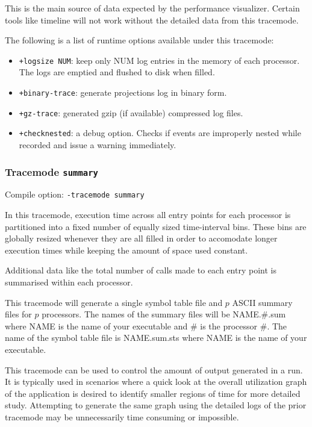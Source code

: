 \documentclass[10pt]{article}
\begin{document}
This is the main source of data expected by the performance
visualizer. Certain tools like timeline will not work without the
detailed data from this tracemode.

The following is a list of runtime options available under this tracemode:

\begin{itemize}
\item
{\tt +logsize NUM}: keep only NUM log entries in the memory of each
processor. The logs are emptied and flushed to disk when filled.
\item
{\tt +binary-trace}:  generate projections log in binary form.
\item
{\tt +gz-trace}:      generated gzip (if available) compressed log files.
\item
{\tt +checknested}: a debug option. Checks if events are improperly nested
while recorded and issue a warning immediately.
\end{itemize}

\subsubsection{Tracemode {\tt summary}}

Compile option: {\tt -tracemode summary}

In this tracemode, execution time across all entry points for each
processor is partitioned into a fixed number of equally sized
time-interval bins. These bins are globally resized whenever they are
all filled in order to accomodate longer execution times while keeping
the amount of space used constant.

Additional data like the total number of calls made to each entry
point is summarised within each processor.

This tracemode will generate a single symbol table file and $p$ ASCII
summary files for $p$ processors. The names of the summary files will
be NAME.\#.sum where NAME is the name of your executable and \# is the
processor \#. The name of the symbol table file is NAME.sum.sts where NAME
is the name of your executable.

This tracemode can be used to control the amount of output generated
in a run. It is typically used in scenarios where a quick look at the
overall utilization graph of the application is desired to identify
smaller regions of time for more detailed study. Attempting to
generate the same graph using the detailed logs of the prior tracemode
may be unnecessarily time consuming or impossible.
\end{document}

